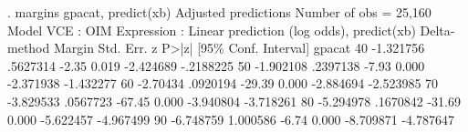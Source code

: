 . margins gpacat, predict(xb)
{\smallskip}
Adjusted predictions                            Number of obs     =     25,160
Model VCE    : OIM
{\smallskip}
Expression   : Linear prediction (log odds), predict(xb)
{\smallskip}
             {\VBAR}            Delta-method
             {\VBAR}     Margin   Std. Err.      z    P>|z|     [95\% Conf. Interval]
      gpacat {\VBAR}
         40  {\VBAR}  -1.321756   .5627314    -2.35   0.019    -2.424689   -.2188225
         50  {\VBAR}  -1.902108   .2397138    -7.93   0.000    -2.371938   -1.432277
         60  {\VBAR}   -2.70434   .0920194   -29.39   0.000    -2.884694   -2.523985
         70  {\VBAR}  -3.829533   .0567723   -67.45   0.000    -3.940804   -3.718261
         80  {\VBAR}  -5.294978   .1670842   -31.69   0.000    -5.622457   -4.967499
         90  {\VBAR}  -6.748759   1.000586    -6.74   0.000    -8.709871   -4.787647
{\smallskip}
